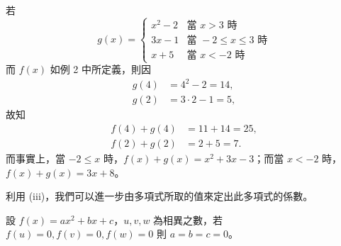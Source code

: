 \begin{example}\label{ex:5-3-10}
若
\begin{equation*}
  g(x) = \begin{cases}
    x^2-2 & \text{當 } x > 3 \text{ 時} \\
    3x-1 & \text{當 } -2 \le x \le 3 \text{ 時} \\
    x+5 & \text{當 } x < -2 \text{ 時}
  \end{cases}
\end{equation*}
而 $f(x)$ 如例 2 中所定義，則因
\begin{align*}
  g(4) &= 4^2-2 = 14, \\
  g(2) &= 3 \cdot 2 - 1 = 5,
\end{align*}
故知
\begin{align*}
  f(4)+g(4) &= 11+14 = 25, \\
  f(2)+g(2) &= 2+5 = 7.
\end{align*}
而事實上，當 $-2 \le x$ 時，$f(x)+g(x)=x^2+3x-3$；而當 $x < -2$ 時，$f(x)+g(x)=3x+8$。
\end{example}

利用 (iii)，我們可以進一步由多項式所取的值來定出此多項式的係數。

\begin{example}\label{ex:5-3-11}
設 $f(x)=ax^2+bx+c$，$u, v, w$ 為相異之數，若 $f(u)=0, f(v)=0, f(w)=0$ 則 $a=b=c=0$。
\end{example}

